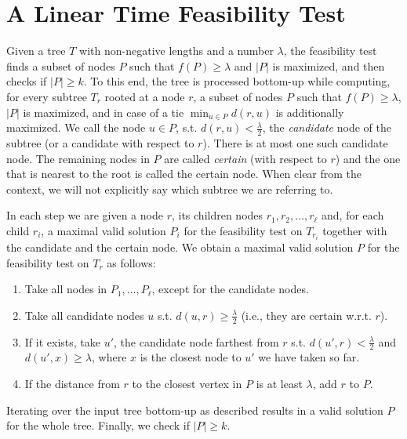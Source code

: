 \documentclass[a4paper,UKenglish]{lipics-v2016}
\theoremstyle{plain}
\begin{document}
\section{A Linear Time Feasibility Test}
\label{linear F.T.}

Given a tree $T$ with non-negative lengths and a number $\lambda$, the feasibility test finds a subset of nodes $P$ such that $f(P)\geq\lambda$
and $|P|$ is maximized, and then checks if $|P|\geq k$.
To this end, the tree is processed bottom-up while computing, for every subtree $T_{r}$ rooted at a node $r$, a subset of nodes $P$ such that
$f(P)\geq\lambda$, $|P|$ is maximized, and in case of a tie $\min_{u\in P}d(r,u)$ is additionally maximized.
We call the node $u\in P$, s.t. $d(r,u)<\frac{\lambda}{2}$, the \emph{candidate} node of the subtree (or a candidate with respect to $r$). There is at most one such candidate node.
The remaining nodes in $P$ are called \emph{certain} (with respect to $r$) and the one that is nearest to the root is called the certain node.
When clear from the context, we will not explicitly say which subtree we are referring to.

In each step we are given a node $r$, its children nodes $r_{1},r_{2},\ldots,r_{\ell}$ and, for each child $r_{i}$, a maximal valid
solution $P_{i}$ for the feasibility test on $T_{r_{i}}$ together with the candidate and the certain node. We obtain a maximal valid solution $P$ for the feasibility test on $T_{r}$ as follows:
\begin{enumerate}
\item Take all nodes in $P_{1},\ldots,P_{\ell}$, except for the candidate nodes.
\item Take all candidate nodes $u$ s.t. $d(u,r) \geq \frac{\lambda}{2}$ (i.e., they are certain w.r.t. $r$).
\item If it exists, take $u'$, the candidate node farthest from $r$ s.t. $d(u',r) < \frac{\lambda}{2}$ and $d(u',x)\geq \lambda$, where $x$ is the closest node to $u'$ we have taken so far.\label{linear time step 3}
\item If the distance from $r$ to the closest vertex in $P$ is at least $\lambda$, add $r$ to $P$.
\end{enumerate}
Iterating over the input tree bottom-up as described results in a valid solution $P$ for the whole tree. Finally, we check if $|P|\geq k$.
\end{document}
